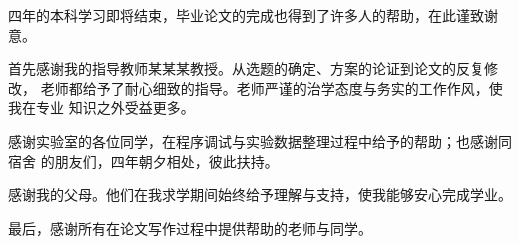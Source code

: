 \begin{acknowledgements}

四年的本科学习即将结束，毕业论文的完成也得到了许多人的帮助，在此谨致谢意。

首先感谢我的指导教师某某某教授。从选题的确定、方案的论证到论文的反复修改，
老师都给予了耐心细致的指导。老师严谨的治学态度与务实的工作作风，使我在专业
知识之外受益更多。

感谢实验室的各位同学，在程序调试与实验数据整理过程中给予的帮助；也感谢同宿舍
的朋友们，四年朝夕相处，彼此扶持。

感谢我的父母。他们在我求学期间始终给予理解与支持，使我能够安心完成学业。

最后，感谢所有在论文写作过程中提供帮助的老师与同学。

\end{acknowledgements}
